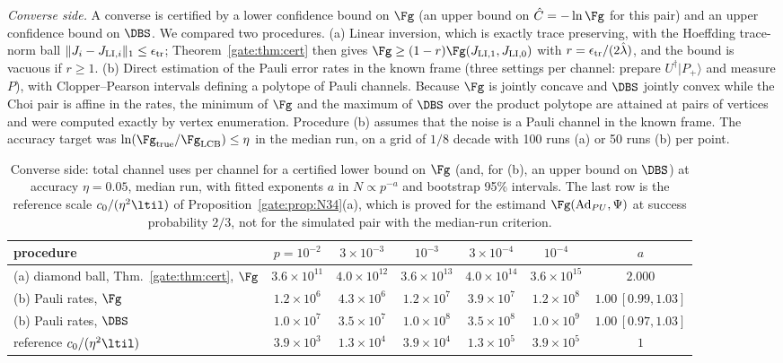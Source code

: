 \emph{Converse side.} A converse is certified by a lower confidence bound on $\Fg$ (an upper bound on $\hat C=-\ln\Fg$ for this pair) and an upper confidence bound on $\DBS$. We compared two procedures. (a) Linear inversion, which is exactly trace preserving, with the Hoeffding trace-norm ball $\|J_i-J_{\mathrm{LI},i}\|_1\le\epsilon_{\rm tr}$; Theorem~\ref{gate:thm:cert} then gives $\Fg\ge(1-r)\Fg(J_{\mathrm{LI},1},J_{\mathrm{LI},0})$ with $r=\epsilon_{\rm tr}/(2\hat\lambda)$, and the bound is vacuous if $r\ge1$. (b) Direct estimation of the Pauli error rates in the known frame (three settings per channel: prepare $U^\dagger|P_+\rangle$ and measure $P$), with Clopper--Pearson intervals defining a polytope of Pauli channels. Because $\Fg$ is jointly concave and $\DBS$ jointly convex while the Choi pair is affine in the rates, the minimum of $\Fg$ and the maximum of $\DBS$ over the product polytope are attained at pairs of vertices and were computed exactly by vertex enumeration. Procedure (b) assumes that the noise is a Pauli channel in the known frame. The accuracy target was $\ln(\Fg_{\rm true}/\Fg_{\rm LCB})\le\eta$ in the median run, on a grid of $1/8$ decade with 100 runs (a) or 50 runs (b) per point.

\begin{table}[!tbp]
\centering
\caption{Converse side: total channel uses per channel for a certified lower bound on $\Fg$ (and, for (b), an upper bound on $\DBS$) at accuracy $\eta=0.05$, median run, with fitted exponents $a$ in $N\propto p^{-a}$ and bootstrap 95\% intervals. The last row is the reference scale $c_0/(\eta^2\ltil)$ of Proposition~\ref{gate:prop:N34}(a), which is proved for the estimand $\Fg(\mathrm{Ad}_{PU},\Psi)$ at success probability $2/3$, not for the simulated pair with the median-run criterion.}
\label{gate:tab:Scert}
\footnotesize
\setlength{\tabcolsep}{3pt}
\begin{tabular}{lcccccc}
\toprule
procedure & $p=10^{-2}$ & $3\times10^{-3}$ & $10^{-3}$ & $3\times10^{-4}$ & $10^{-4}$ & $a$\\
\midrule
(a) diamond ball, Thm.~\ref{gate:thm:cert}, $\Fg$ & $3.6\times10^{11}$ & $4.0\times10^{12}$ & $3.6\times10^{13}$ & $4.0\times10^{14}$ & $3.6\times10^{15}$ & $2.000$\\
(b) Pauli rates, $\Fg$ & $1.2\times10^{6}$ & $4.3\times10^{6}$ & $1.2\times10^{7}$ & $3.9\times10^{7}$ & $1.2\times10^{8}$ & $1.00\,[0.99,1.03]$\\
(b) Pauli rates, $\DBS$ & $1.0\times10^{7}$ & $3.5\times10^{7}$ & $1.0\times10^{8}$ & $3.5\times10^{8}$ & $1.0\times10^{9}$ & $1.00\,[0.97,1.03]$\\
reference $c_0/(\eta^2\ltil)$ & $3.9\times10^{3}$ & $1.3\times10^{4}$ & $3.9\times10^{4}$ & $1.3\times10^{5}$ & $3.9\times10^{5}$ & $1$\\
\bottomrule
\end{tabular}
\end{table}

